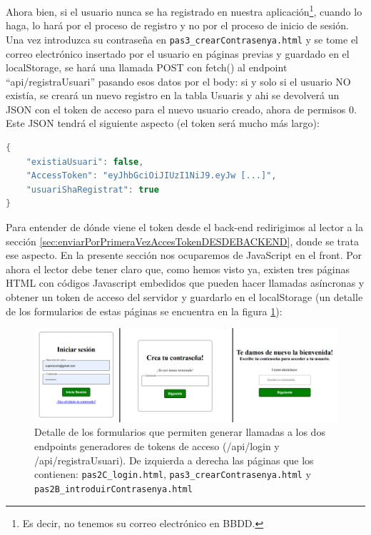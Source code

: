 \documentclass[a4paper,12pt]{report}
\begin{document}
	
	
	Ahora bien, si el usuario nunca se ha registrado en nuestra aplicación\footnote{Es decir, no tenemos su correo electrónico en BBDD.}, cuando lo haga, lo hará por el proceso de registro y no por el proceso de inicio de sesión. Una vez introduzca su contraseña en \texttt{pas3\_crearContrasenya.html} y se tome el correo electrónico insertado por el usuario en páginas previas y guardado en el localStorage, se hará una llamada POST con fetch() al endpoint ``api/registraUsuari'' pasando esos datos por el body: si y solo si el usuario NO existía, se creará un nuevo registro en la tabla Usuaris y ahi se devolverá un JSON con el token de acceso para el nuevo usuario creado, ahora de permisos 0. Este JSON tendrá el siguiente aspecto (el token será mucho más largo):
	
	
	
\begin{lstlisting}[language=Java, basicstyle=\ttfamily\footnotesize, keywordstyle=\color{magenta}]
{
	"existiaUsuari": false,
	"AccessToken": "eyJhbGciOiJIUzI1NiJ9.eyJw [...]",
	"usuariShaRegistrat": true
}
\end{lstlisting}
	
	
	Para entender de dónde viene el token desde el back-end redirigimos al lector a la sección \ref{sec:enviarPorPrimeraVezAccesTokenDESDEBACKEND}, donde se trata ese aspecto. En la presente sección nos ocuparemos de JavaScript en el front. Por ahora el lector debe tener claro que, como hemos visto ya, existen tres páginas HTML con códigos Javascript embedidos que pueden hacer llamadas asíncronas y obtener un token de acceso del servidor y guardarlo en el localStorage (un detalle de los formularios de estas páginas se encuentra en la figura \ref{fig:figPaginesQueExpedeixenJWT}):
	
	\setlength{\belowcaptionskip}{3pt}
	\FloatBarrier
	\begin{figure}[H]
		\centering
		\caption{Detalle de los formularios que permiten generar llamadas a los dos endpoints generadores de tokens de acceso (/api/login y /api/registraUsuari). De izquierda a derecha las páginas que los contienen: \texttt{pas2C\_login.html}, \texttt{pas3\_crearContrasenya.html} y \texttt{pas2B\_introduirContrasenya.html}}
		\includegraphics[width=1\textwidth]{img/figPaginesQueExpedeixenJWT.png}
		
		\label{fig:figPaginesQueExpedeixenJWT} 
	\end{figure}
	\FloatBarrier
	
\end{document}
